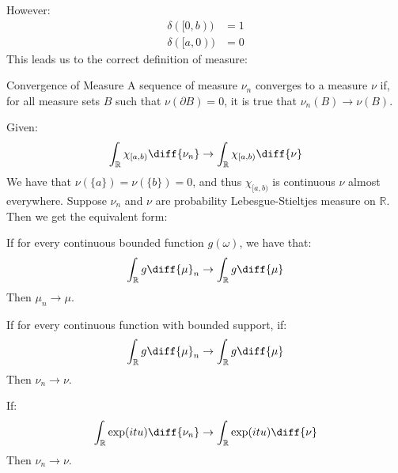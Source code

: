             However:
            \begin{align}
                \delta([0,b))&=1\\
                \delta([a,0))&=0
            \end{align}
            This leads us to the correct definition of measure:
            \begin{ldefinition}{Convergence of Measure}
                A sequence of measure $\nu_{n}$ converges to a
                measure $\nu$ if, for all measure sets $B$ such
                that $\nu(\partial{B})=0$, it is true that
                $\nu_{n}(B)\rightarrow\nu(B)$.
            \end{ldefinition}
            Given:
            \begin{equation}
                \int_{\mathbb{R}}\chi_{[a,b)}\diff{\nu_{n}}
                \rightarrow\int_{\mathbb{R}}\chi_{[a,b)}\diff{\nu}
            \end{equation}
            We have that $\nu(\{a\})=\nu(\{b\})=0$, and thus
            $\chi_{[a,b)}$ is continuous $\nu$ almost everywhere.
            Suppose $\nu_{n}$ and $\nu$ are probability
            Lebesgue-Stieltjes measure on $\mathbb{R}$. Then we
            get the equivalent form:
            \begin{theorem}
                If for every continuous bounded function $g(\omega)$,
                we have that:
                \begin{equation}
                    \int_{\mathbb{R}}g\diff{\mu}_{n}\rightarrow
                    \int_{\mathbb{R}}g\diff{\mu}
                \end{equation}
                Then $\mu_{n}\rightarrow\mu$.
            \end{theorem}
            \begin{theorem}
                If for every continuous function with bounded support,
                if:
                \begin{equation}
                    \int_{\mathbb{R}}g\diff{\mu}_{n}\rightarrow
                    \int_{\mathbb{R}}g\diff{\mu}
                \end{equation}
                Then $\nu_{n}\rightarrow\nu$.
            \end{theorem}
            \begin{theorem}
                If:
                \begin{equation}
                    \int_{\mathbb{R}}\exp(itu)\diff{\nu_{n}}\rightarrow
                    \int_{\mathbb{R}}\exp(itu)\diff{\nu}
                \end{equation}
                Then $\nu_{n}\rightarrow\nu$.
            \end{theorem}
